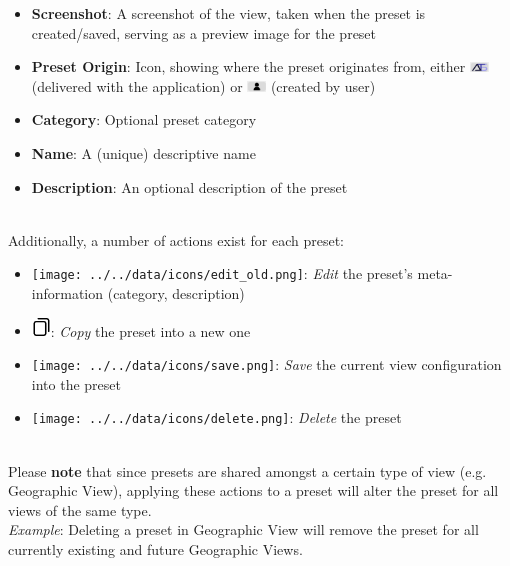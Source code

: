 \begin{itemize}
 \item \textbf{Screenshot}: A screenshot of the view, taken when the preset is created/saved, serving as a preview image for the preset
 \item \textbf{Preset Origin}: Icon, showing where the preset originates from, either \includegraphics[width=0.5cm,frame]{figures/view_presets_origin_openats.png} (delivered with the application) 
 or \includegraphics[width=0.5cm,frame]{figures/view_presets_origin_user.png} (created by user)
 \item \textbf{Category}: Optional preset category
 \item \textbf{Name}: A (unique) descriptive name
 \item \textbf{Description}: An optional description of the preset
\end{itemize} \ \\

Additionally, a number of actions exist for each preset:

\begin{itemize}
 \item \texttt{[image: ../../data/icons/edit\_old.png]}: \textit{Edit} the preset's meta-information (category, description)
 \item \includegraphics[width=0.5cm,frame]{../../data/icons/copy.png}: \textit{Copy} the preset into a new one
 \item \texttt{[image: ../../data/icons/save.png]}: \textit{Save} the current view configuration into the preset
 \item \texttt{[image: ../../data/icons/delete.png]}: \textit{Delete} the preset
\end{itemize} \ \\

Please \textbf{note} that since presets are shared amongst a certain type of view (e.g. Geographic View), applying these actions to a preset 
will alter the preset for all views of the same type. \\

\textit{Example}: Deleting a preset in Geographic View will remove the preset for all currently existing and future Geographic Views. \\

